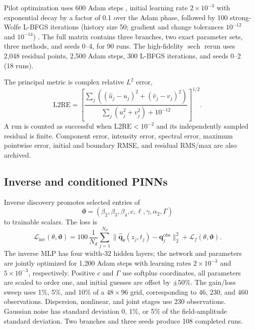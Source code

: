 \documentclass[11pt]{article}
\newcommand{\Ltwo}{\mathrm{L2RE}}
\newcommand{\sech}{\operatorname{sech}}
\begin{document}
Pilot optimization uses 600 Adam steps \citep{kingma2015}, initial learning
rate $2\times10^{-3}$
with exponential decay by a factor of 0.1 over the Adam phase, followed by 100
strong-Wolfe L-BFGS iterations (history size 50; gradient and change
tolerances $10^{-12}$ and $10^{-14}$) \citep{liunocedal1989}.  The full matrix contains three
branches, two exact parameter sets, three methods, and seeds 0--4, for 90
runs.  The high-fidelity $\sech$ rerun uses 2,048 residual points, 2,500 Adam
steps, 300 L-BFGS iterations, and seeds 0--2 (18 runs).

The principal metric is complex relative $L^2$ error,
\begin{equation}
\Ltwo=\left[
\frac{\sum_j\left((\hat u_j-u_j)^2+(\hat v_j-v_j)^2\right)}
{\sum_j(u_j^2+v_j^2)+10^{-12}}
\right]^{1/2}.
\label{eq:l2re}
\end{equation}
A run is counted as successful when $\Ltwo<10^{-2}$ and its independently
sampled residual is finite.  Component error, intensity error, spectral error,
maximum pointwise error, initial and boundary RMSE, and residual RMS/max are
also archived.

\subsection{Inverse and conditioned PINNs}

Inverse discovery promotes selected entries of
\begin{equation}
\boldsymbol{\vartheta}=(\beta_2,\beta_3,\beta_4,c,\ell,
\gamma,\alpha_2,\Gamma)
\end{equation}
to trainable scalars.  The loss is
\begin{equation}
\label{eq:inverse-loss}
\mathcal{L}_{\mathrm{inv}}(\theta,\boldsymbol{\vartheta})
=100\,\frac{1}{N_d}\sum_{j=1}^{N_d}
\|\widehat{\boldsymbol{q}}_{\theta}(z_j,t_j)-
\boldsymbol{q}_j^{\mathrm{obs}}\|_2^2
+\mathcal{L}_{f}(\theta,\boldsymbol{\vartheta}).
\end{equation}
The inverse MLP has four width-32 hidden layers; the network and parameters are
jointly optimized for 1,200 Adam steps with learning rates $2\times10^{-3}$
and $5\times10^{-3}$, respectively.  Positive $c$ and $\Gamma$ use softplus
coordinates, all parameters are scaled to order one, and initial guesses are
offset by $\pm50\%$.  The gain/loss sweep uses 1\%, 5\%, and 10\% of a
$48\times96$ grid, corresponding to 46, 230, and 460 observations.  Dispersion,
nonlinear, and joint stages use 230 observations.  Gaussian noise has standard
deviation 0, 1\%, or 5\% of the field-amplitude standard deviation.  Two
branches and three seeds produce 108 completed runs.
\end{document}

